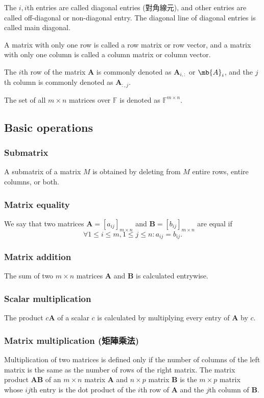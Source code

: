 \documentclass[a4paper,12pt]{report}
\begin{document}
The $i,i$th entries are called diagonal entries (對角線元), and other entries are called off-diagonal or non-diagonal entry. The diagonal line of diagonal entries is called main diagonal.

A matrix with only one row is called a row matrix or row vector, and a matrix with only one column is called a column matrix or column vector.

The $i$th row of the matrix $\mathbf{A}$ is commonly denoted as $\mathbf{A}_{i,:}$ or $\mb{A}_i$, and the $j$th column is commonly denoted as $\mathbf{A}_{:,j}$.

The set of all $m\times n$ matrices over $\mathbb{F}$ is denoted as $\mathbb{F}^{m\times n}$.
\subsection{Basic operations}
\subsubsection{Submatrix}
A submatrix of a matrix $M$ is obtained by deleting from $M$ entire rows, entire columns, or both.
\subsubsection{Matrix equality}
We say that two matrices $\mathbf{A}=[a_{ij}]_{m\times n}$ and $\mathbf{B}=[b_{ij}]_{m\times n}$ are equal if
\[\forall 1\leq i\leq m,1\leq j\leq n\colon a_{ij}=b_{ij}.\]
\subsubsection{Matrix addition}
The sum of two $m\times n$ matrices $\mathbf{A}$ and $\mathbf{B}$ is calculated entrywise.
\subsubsection{Scalar multiplication}
The product $c\mathbf{A}$ of a scalar $c$ is calculated by multiplying every entry of $\mathbf{A}$ by $c$.
\subsubsection{Matrix multiplication (矩陣乘法)}
Multiplication of two matrices is defined only if the number of columns of the left matrix is the same as the number of rows of the right matrix. The matrix product $\mathbf{A}\mathbf{B}$ of an $m\times n$ matrix $\mathbf{A}$ and $n\times p$ matrix $\mathbf{B}$ is the $m\times p$ matrix whose $ij$th entry is the dot product of the $i$th row of $\mathbf{A}$ and the $j$th column of $\mathbf{B}$.
\end{document}
